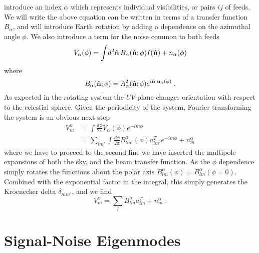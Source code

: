 \documentclass{revtex4}
\newcommand{\la}{\ensuremath{\left\langle}}
\newcommand{\ra}{\ensuremath{\right\rangle}}
\begin{document}
introduce an index $\alpha$ which represents individual visibilities,
or pairs $ij$ of feeds. We will write the above equation can be written in terms of a
transfer function $B_\alpha$, and will introduce Earth rotation by
adding a dependence on the azimuthal angle $\phi$. We also introduce a
term for the noise common to both feeds 
\begin{equation}
V_\alpha(\phi) = \int \! d^2\hat{\mathbf{n}}\, B_\alpha(\hat{\mathbf{n}}; \phi) I(\hat{\mathbf{n}})
+ n_\alpha(\phi)
\end{equation}
where
\begin{equation}
B_\alpha(\hat{\mathbf{n}}; \phi) = A_\alpha^2(\hat{\mathbf{n}}; \phi) e^{i \hat{\mathbf{n}} \cdot
  \mathbf{u}_{\alpha}(\phi)} \; .
\end{equation}
As expected in the rotating system the $UV$-plane changes orientation
with respect to the celestial sphere. Given the periodicity of the
system, Fourier transforming the system is an obvious next step
\begin{align}
V^\alpha_m &= \int \frac{d\phi}{2\pi} V_\alpha(\phi) e^{-i m \phi} \\
& = \sum_{l m'}\int \frac{d\phi}{2\pi} B^\alpha_{l m'}(\phi) a^T_{l
  m'}  e^{-i m \phi}+ n^\alpha_m
\end{align}
where we have to proceed to the second line we have inserted the
multipole expansions of both the sky, and the beam transfer
function. As the $\phi$ dependence simply rotates the functions about
the polar axis $B^\alpha_{lm}(\phi) =
B^{\alpha}_{lm}(\phi=0)$. Combined with the exponential factor in the
integral, this simply generates the Kroenecker delta $\delta_{mm'}$,
and we find
\begin{equation}
V^\alpha_m = \sum_{l} B^\alpha_{l m} a^T_{l m}+ n^\alpha_m \; .
\end{equation}

\section{Signal-Noise Eigenmodes}

\end{document}
